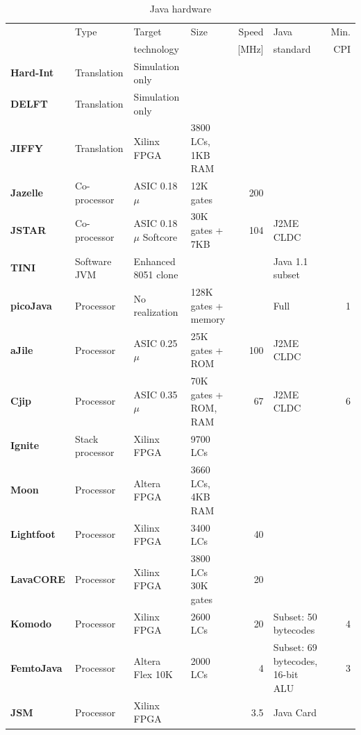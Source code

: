 \begin{table}
    \centering
{\footnotesize
\begin{tabular}
    {|>{\bfseries}p{1.6cm}|m{1.5cm}|>{\raggedright}m{1.6cm}|>{\raggedright}m{1.6cm}
    |r|>{\raggedright}m{1.5cm}|r|}

    \hline
         & Type & Target  & Size & Speed & Java     & Min. \\
         &      & technology &      & [MHz] & standard & CPI  \\
    \hline
    Hard-Int & Translation & Simulation only &  &  &  &  \\
    \hline
    DELFT & Translation & Simulation only &  &  &  &    \\
    \hline
    JIFFY & Translation & Xilinx FPGA & 3800 LCs, 1KB RAM &  &  &   \\
    \hline
    Jazelle & Co-processor & ASIC 0.18$\mu$ & 12K gates & 200 &  &  \\
    \hline
    JSTAR & Co-processor & ASIC 0.18$\mu$ Softcore & 30K gates + 7KB & 104 & J2ME CLDC\footnotemark[2] &  \\
    \hline
    TINI & Software JVM & Enhanced 8051 clone &  &  & Java 1.1 subset &   \\
    \hline
    picoJava & Processor & No realization & 128K gates + memory &  & Full & 1  \\
    \hline
    aJile & Processor & ASIC 0.25$\mu$ & 25K gates + ROM & 100 & J2ME CLDC\footnotemark[2] &   \\
    \hline
    Cjip & Processor & ASIC 0.35$\mu$ & 70K gates + ROM, RAM & 67 & J2ME CLDC\footnotemark[2] & 6 \\
    \hline
    Ignite & Stack processor & Xilinx FPGA & 9700 LCs &  &  &   \\
    \hline
    Moon & Processor & Altera FPGA & 3660 LCs, 4KB RAM &  &  &   \\
    \hline
    Lightfoot & Processor & Xilinx FPGA & 3400 LCs & 40 &  &   \\
    \hline
    LavaCORE & Processor & Xilinx FPGA & 3800 LCs 30K gates & 20 &  &   \\
    \hline
    Komodo & Processor & Xilinx FPGA & 2600 LCs & 20 & Subset: 50 bytecodes & 4  \\
    \hline
    FemtoJava & Processor & Altera Flex 10K & 2000 LCs & 4 & Subset: 69 bytecodes, 16-bit ALU & 3 \\
    \hline
    JSM \cite{JSM01} & Processor & Xilinx FPGA &  & 3.5 & Java Card &   \\
    \hline

\end{tabular}
}
    \caption{Java hardware}
    \label{tab_related_proc}
\end{table}

